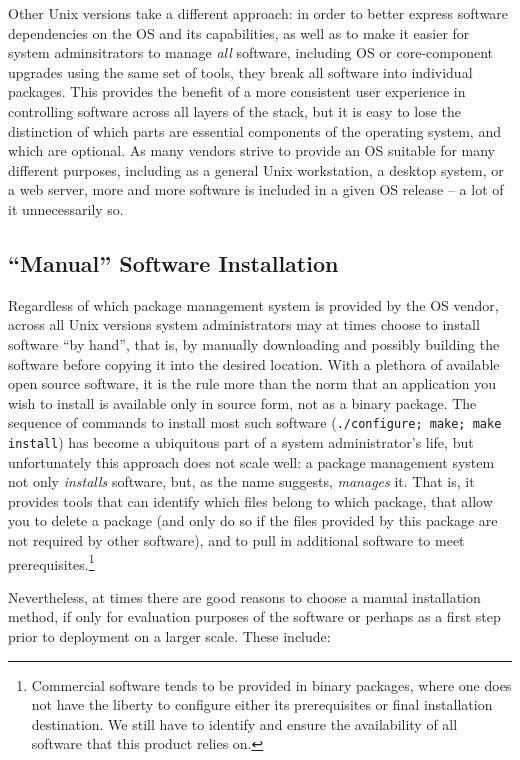 Other Unix versions take a different approach: in
order to better express software dependencies on the
OS and its capabilities, as well as to make it easier
for system adminsitrators to manage {\em all}
software, including OS or core-component upgrades
using the same set of tools, they break all software
into individual packages.  This provides the benefit
of a more consistent user experience in controlling
software across all layers of the stack, but it is
easy to lose the distinction of which parts are
essential components of the operating system, and
which are optional.  As many vendors strive to provide
an OS suitable for many different purposes,
including as a general Unix workstation, a desktop
system, or a web server, more and more software is
included in a given OS release -- a lot of it
unnecessarily so.

\subsection{``Manual'' Software Installation}
\label{software-installation:package-management:manual}

Regardless of which package management system is
provided by the OS vendor, across all Unix versions
system administrators may at times choose to install
software ``by hand'', that is, by manually downloading
and possibly building the software before copying it
into the desired location.  With a plethora of
available open source software, it is the rule more
than the norm that an application you wish to install
is available only in source form, not as a binary
package.  The sequence of commands to install most
such software ({\tt ./configure; make; make install})
has become a ubiquitous part of a system
administrator's life, but unfortunately this approach
does not scale well:  a package management system not
only {\em installs} software, but, as the name
suggests, {\em manages} it.  That is, it provides tools
that can identify which files belong to which package,
that allow you to delete a package (and only do so if
the files provided by this package are not required by
other software), and to pull in additional software to
meet prerequisites.\footnote{Commercial software tends
to be provided in binary packages, where one does not
have the liberty to configure either its prerequisites
or final installation destination.  We still have to
identify and ensure the availability of all software
that this product relies on.}

Nevertheless, at times there are good reasons to choose a manual
installation method, if only for evaluation purposes of the software or
perhaps as a first step prior to deployment on a larger scale.  These
include:

